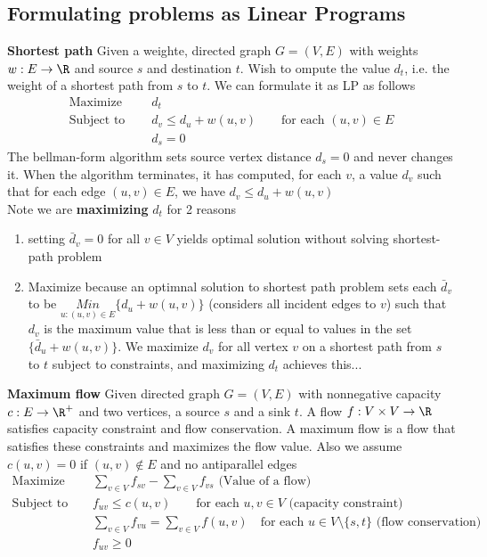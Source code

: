 \documentclass[11pt]{article}
\begin{document}
\subsection*{Formulating problems as Linear Programs}


\begin{defn*}
    \textbf{Shortest path} Given a weighte, directed graph $G=  (V,E)$ with weights $w:E\to\R$ and source $s$ and destination $t$. Wish to ompute the value $d_t$, i.e. the weight of a shortest path from $s$ to $t$. We can formulate it as LP as follows 
    \begin{align*}
        \text{Maximize  } \quad & d_t \\
        \text{Subject to  }\quad  & d_v \leq d_u + w(u,v) \quad \quad \text{for each } (u,v)\in E \\
        & d_s = 0
    \end{align*}
    The bellman-form algorithm sets source vertex distance $d_s = 0$ and never changes it. When the algorithm terminates, it has computed, for each $v$, a value $d_v$ such that for each edge $(u,v)\in E$, we have $d_v \leq d_u + w(u,v)$ \\
    Note we are \textbf{maximizing} $d_t$ for 2 reasons
    \begin{enumerate}
        \item setting $\bar{d}_v = 0$ for all $v\in V$ yields optimal solution without solving shortest-path problem 
        \item Maximize because an optimnal solution to shortest path problem sets each $\bar{d}_v$ to be $\underset{u: (u,v)\in E}{Min}\{d_u + w(u,v) \}$ (considers all incident edges to $v$) such that $d_v$ is the maximum value that is less than or equal to values in the set $\{ \bar{d}_u + w(u,v)\}$. We maximize $d_v$ for all vertex $v$ on a shortest path from $s$ to $t$ subject to constraints, and maximizing $d_t$ achieves this...
    \end{enumerate}
\end{defn*}



\begin{defn*}
    \textbf{Maximum flow}
    Given directed graph $G = (V,E)$ with nonnegative capacity $c:E\to\R^+$ and two vertices, a source $s$ and a sink $t$. A flow $f: V\times V\to \R$ satisfies capacity constraint and flow conservation. A maximum flow is a flow that satisfies these constraints and maximizes the flow value. Also we assume $c(u,v) = 0$ if $(u,v)\not\in E$ and no antiparallel edges
    \begin{align*}
        \text{Maximize  } \quad & \sum_{v\in V} f_{sv} - \sum_{v\in V} f_{vs} \text{ (Value of a flow)} \\
        \text{Subject to  }\quad  & f_{uv} \leq c(u,v) \quad \quad \text{for each } u,v\in V \text{ (capacity constraint)} \\
        & \sum_{v\in V} f_{vu} = \sum_{v\in V} f(u,v) \quad \text{for each } u\in V \setminus \{s,t \} \text{ (flow conservation)} \\
        & f_{uv} \geq 0 \\
    \end{align*}
\end{defn*}
\end{document}
